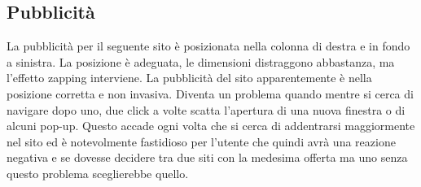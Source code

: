 \subsection{Pubblicità} \label{Pubblicità}
La pubblicità per il seguente sito è posizionata nella colonna di destra e in fondo a sinistra. La posizione è adeguata, le dimensioni distraggono abbastanza, ma l'effetto zapping interviene. La pubblicità del sito apparentemente è nella posizione corretta e non invasiva. Diventa un problema quando mentre si cerca di navigare dopo uno, due click a volte scatta l'apertura di una nuova finestra o di alcuni pop-up. Questo accade ogni volta che si cerca di addentrarsi maggiormente nel sito ed è notevolmente fastidioso per l'utente che quindi avrà una reazione negativa e se dovesse decidere tra due siti con la medesima offerta ma uno senza questo problema sceglierebbe quello. 